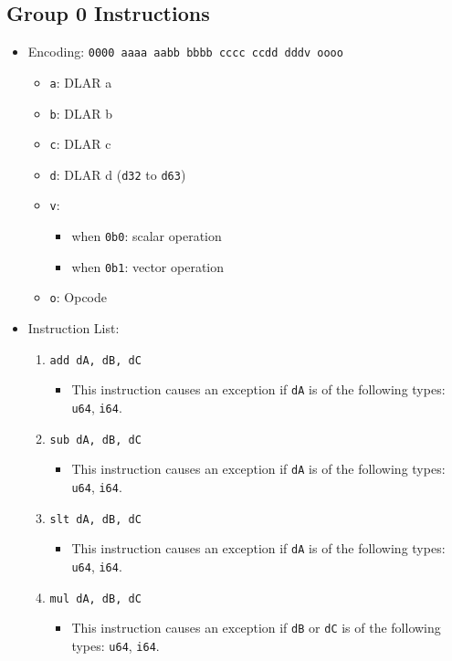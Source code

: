 \documentclass{article}
\begin{document}
	\subsection{Group 0 Instructions}
		\begin{itemize}
		\item Encoding: \texttt{0000 aaaa aabb bbbb  cccc ccdd dddv oooo}
			\begin{itemize}
			\item \texttt{a}:  DLAR a
			\item \texttt{b}:  DLAR b
			\item \texttt{c}:  DLAR c
			\item \texttt{d}:  DLAR d (\texttt{d32} to \texttt{d63})
			\item \texttt{v}:
				\begin{itemize}
				\item when \texttt{0b0}:  scalar operation
				\item when \texttt{0b1}:  vector operation
				\end{itemize}
			\item \texttt{o}:  Opcode
			\end{itemize}
		\item Instruction List:
			\begin{enumerate}
			\item \texttt{add dA, dB, dC}
				\begin{itemize}
				\item This instruction causes an exception if \texttt{dA}
				is of the following types:  \texttt{u64}, \texttt{i64}.
				\end{itemize}
			\item \texttt{sub dA, dB, dC}
				\begin{itemize}
				\item This instruction causes an exception if \texttt{dA}
				is of the following types:  \texttt{u64}, \texttt{i64}.
				\end{itemize}
			\item \texttt{slt dA, dB, dC}
				\begin{itemize}
				\item This instruction causes an exception if \texttt{dA}
				is of the following types:  \texttt{u64}, \texttt{i64}.
				\end{itemize}
			\item \texttt{mul dA, dB, dC}
				\begin{itemize}
				\item This instruction causes an exception if \texttt{dB}
				or \texttt{dC} is of the following types:  \texttt{u64},
				\texttt{i64}.
				\end{itemize}


\end{enumerate}
\end{itemize}
\end{document}
